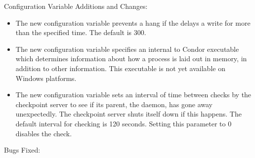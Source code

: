 \noindent Configuration Variable Additions and Changes:

\begin{itemize}

\item The new configuration variable 
prevents a hang if the  delays a write 
for more than the specified time.
The default is 300.

\item The new configuration variable  
specifies an internal to Condor
executable which determines information about how a process is laid out
in memory, in addition to other information. This executable is not yet
available on Windows platforms.

\item The new configuration variable 
 sets an interval
of time between checks by the checkpoint server to see if 
its parent, the  daemon, has gone away unexpectedly.
The checkpoint server shuts itself down if this happens.
The default interval for checking is 120 seconds.
Setting this parameter to 0 disables the check.

\end{itemize}

\noindent Bugs Fixed:

